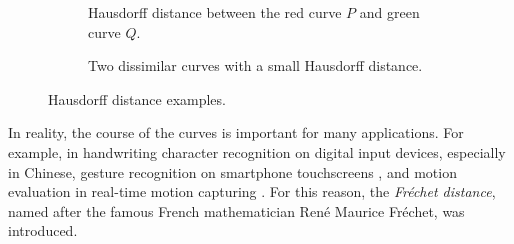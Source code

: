 \documentclass[
oneside,
fontsize=11pt
]{scrartcl}
\begin{document}
\begin{figure}[ht]
  \centering
  \begin{subfigure}[b]{0.45\textwidth}
      \caption{Hausdorff distance between the red curve $P$ and green curve $Q$. }
      \label{fig_hausdorff_distance_example}
  \end{subfigure}
  \hfill
  \begin{subfigure}[b]{0.45\textwidth}
      \caption[Hausdorff distance of two dissimilar curves]{Two dissimilar curves with a small Hausdorff distance.}
      \label{fig_hausdorff_distance_bad_example}
  \end{subfigure}
  \caption[Hausdorff distance examples]{Hausdorff distance examples.}
  \label{fig_hausdorff_distance_examples}
\end{figure}


In reality, the course of the curves is important for many applications. 
For example, in handwriting character recognition on digital input devices, especially in Chinese, %
gesture recognition on smartphone touchscreens \cite{hu_research_2022}, %
and motion evaluation in real-time motion capturing \cite{qiao_real-time_2017, shehu_curve_2012}. %
For this reason, the \textit{Fréchet distance}, named after the famous French mathematician René Maurice Fréchet, was introduced.
\end{document}
